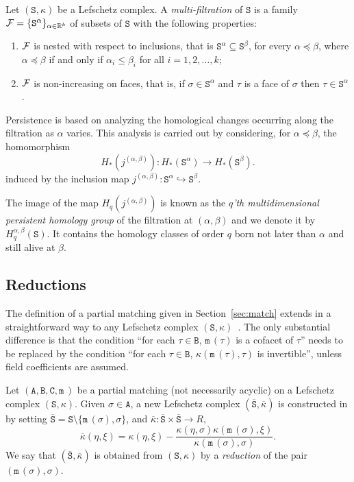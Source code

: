 \documentclass[12pt]{article}
\newenvironment{aenum}{\begin{enumerate}
 \renewcommand{\theenumi}{\alph{enumi}}
 \renewcommand{\labelenumi}{(\theenumi)}}{\end{enumerate}}
\newcommand{\R}{{\mathbb R}}
\newcommand{\cF}{{\cal F}}
\newcommand{\ma}{\texttt{m}\,} \newcommand{\re}{\texttt{r}\,}
\newcommand{\sS}{\texttt{S}} \newcommand{\sA}{\texttt{A}}
\newcommand{\sB}{\texttt{B}}
\newcommand{\sC}{\texttt{C}} \newcommand{\sD}{\texttt{D}} \newcommand{\sM}{\texttt{M}} \newcommand{\sL}{\texttt{L}}
\begin{document}
Let $(\sS, \kappa)$ be a Lefschetz complex. A {\em multi-filtration} of $\sS$ is a family $\cF=\{\sS^\alpha\}_{\alpha\in \R^k}$ of
subsets of $\sS$ with the following properties:
\begin{aenum}
\item $\cF$ is nested with respect to inclusions, that is $\sS^\alpha\subseteq \sS^{\beta}$, for every $\alpha\preceq \beta$,
where $\alpha\preceq \beta$ if and only if $\alpha_i \leq \beta_i$ for all $i=1,2,\ldots, k$;
\item $\cF$ is non-increasing on faces, that is, if $\sigma \in \sS^\alpha$ and $\tau$ is a face of $\sigma$ then $\tau \in \sS^\alpha$.
\end{aenum}

Persistence is based on analyzing the homological changes occurring along the filtration as $\alpha$ varies. This analysis is carried out by considering, for $\alpha\preceq\beta$, the homomorphism
\[
H_*(j^{(\alpha,\beta)}): H_*(\sS^{\alpha}) \to H_*(\sS^{\beta}).
\]
induced by the inclusion map $j^{(\alpha,\beta)}:\sS^{\alpha}\hookrightarrow \sS^{\beta}$.

The image of the map $H_q(j^{(\alpha,\beta)})$ is  known as the {\em $q$'th multidimensional persistent homology group} of the filtration at $(\alpha,\beta)$ and we denote it by $H_q^{\alpha,\beta}(\sS)$. It contains the homology classes of order $q$ born not later than $\alpha$ and still alive at $\beta$.

\subsection{Reductions}\label{sec:reductions}

The definition of a partial matching given in Section~\ref{sec:match} extends in a straightforward way to any Lefschetz complex $(\sS, \kappa)$~\cite{AlKaLa17}. The only substantial difference is that the condition ``for each $\tau\in \sB$, $\ma(\tau)$ is a cofacet of $\tau$'' needs to be replaced by the condition ``for each $\tau\in \sB$, $\kappa(\ma(\tau),\tau)$ is invertible'', unless field coefficients are assumed.

Let  $(\sA,\sB,\sC,\ma)$ be a partial matching (not necessarily acyclic) on a Lefschetz complex $(\sS, \kappa)$. Given $\sigma\in \sA$, a new Lefschetz complex $(\overline{\sS}, \overline{\kappa})$ is constructed in \cite{AlKaLa17} by setting $\overline{\sS}=\sS\setminus \{\ma(\sigma),\sigma\}$, and $\overline{\kappa}:\overline{\sS}\times \overline{\sS}\to R$,
\begin{equation}\label{eq:kappa-bar}
\overline{\kappa}(\eta,\xi)=\kappa(\eta,\xi)-\frac{\kappa(\eta,\sigma)\kappa(\ma(\sigma),\xi)}{\kappa(\ma(\sigma),\sigma)}.
\end{equation}
We say that $(\overline{\sS}, \overline{\kappa})$ is obtained from $(\sS,\kappa)$ by a {\em reduction} of the pair $(\ma(\sigma),\sigma)$.
\end{document}
